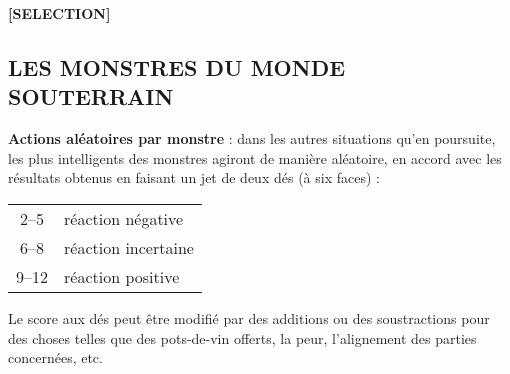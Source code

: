 \begin{center}
\textbf{[SELECTION]}
\end{center}

\subsection*{LES MONSTRES DU MONDE SOUTERRAIN}

\label{dd3-actions-monstres}\textbf{Actions aléatoires par monstre} : dans les autres situations qu'en poursuite, les plus intelligents des monstres agiront de manière aléatoire, en accord avec les résultats obtenus en faisant un jet de deux dés (à six faces) :

\bigskip

{\parindent6cm \begin{tabular}{cl}
2--5 & réaction négative \\
6--8 & réaction incertaine \\
9--12 & réaction positive \\
\end{tabular}}

\medskip

Le score aux dés peut être modifié par des additions ou des soustractions pour des choses telles que des pots-de-vin offerts, la peur, l'alignement des parties concernées, etc.

